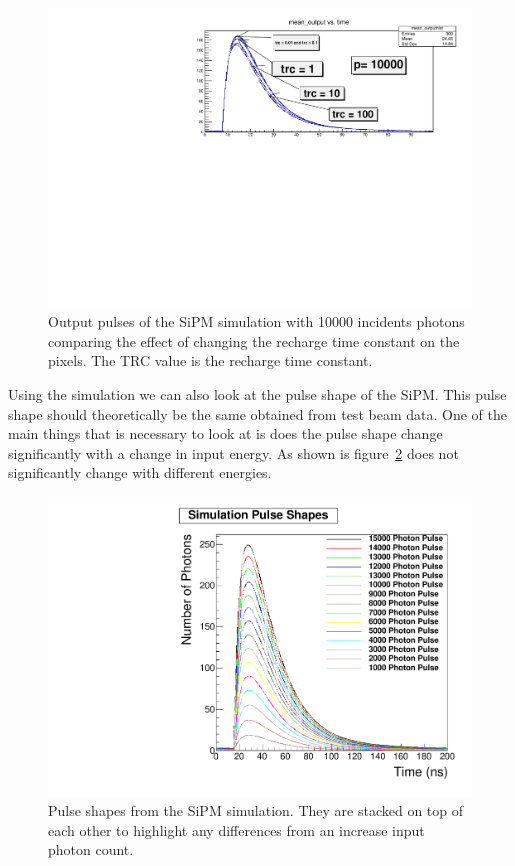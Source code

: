 \begin{figure}
\centering
\includegraphics[width=\linewidth]{Figures/p10000trc.pdf}
\caption{Output pulses of the SiPM simulation with 10000 incidents photons comparing the effect of changing the recharge time constant on the pixels. The TRC value is the recharge time constant.}
\label{fig:trc}
\end{figure}

Using the simulation we can also look at the pulse shape of the SiPM. This pulse shape should theoretically be the same obtained from test beam data. One of the main things that is necessary to look at is does the pulse shape change significantly with a change in input energy. As shown is figure~\ref{fig:SimPul} does not significantly change with different energies.

\begin{figure}
\centering
\includegraphics[width=\linewidth]{Figures/SimPul.pdf}
\caption{Pulse shapes from the SiPM simulation. They are stacked on top of each other to highlight any differences from an increase input photon count.}
\label{fig:SimPul}
\end{figure}

